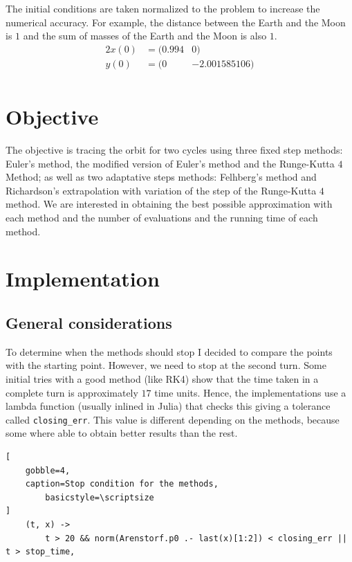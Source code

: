 \documentclass[12pt, onside]{article}
\begin{document}
    The initial conditions are taken normalized to the problem
to increase the numerical accuracy.
For example, the distance between the Earth and the Moon is $1$ and
the sum of masses of the Earth and the Moon is also $1$.
%
\begin{alignat*}{2}
    x(0) &= (\num{0.994} & 0) \\
    y(0) &= (0 & \num{-2.001585106}) \\
\end{alignat*}

\section{Objective}

    The objective is tracing the orbit for two cycles
using three fixed step methods:
Euler's method, the modified version of Euler's method and the Runge-Kutta $4$ Method;
as well as two adaptative steps methods: Felhberg's method and
Richardson's extrapolation with variation of the step of the Runge-Kutta $4$ method.
We are interested in obtaining the best possible approximation with each method
and the number of evaluations and the running time of each method.

\section{Implementation}

\subsection{General considerations}

    To determine when the methods should stop
I decided to compare the points with the starting point.
However, we need to stop at the second turn.
Some initial tries with a good method (like RK4) show that
the time taken in a complete turn is approximately $17$ time units.
Hence, the implementations use a lambda function (usually inlined in Julia) that checks
this giving a tolerance called \lstinline!closing_err!.
This value is different depending on the methods,
because some where able to obtain better results than the rest.

\begin{lstlisting}[
    gobble=4,
    caption=Stop condition for the methods,
        basicstyle=\scriptsize
]
    (t, x) ->
        t > 20 && norm(Arenstorf.p0 .- last(x)[1:2]) < closing_err || t > stop_time,
\end{lstlisting}
\end{document}
